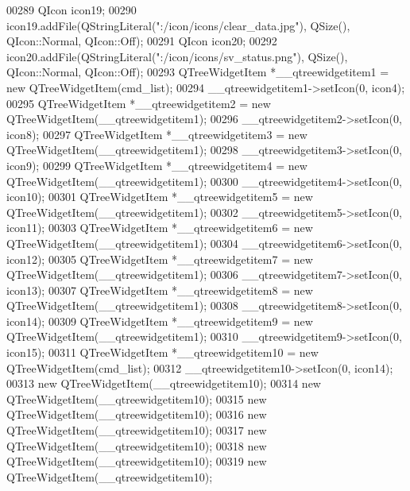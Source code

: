\begin{DoxyCode}
00289         QIcon icon19;
00290         icon19.addFile(QStringLiteral(\textcolor{stringliteral}{":/icon/icons/clear\_data.jpg"}), QSize(), QIcon::Normal, QIcon::Off);
00291         QIcon icon20;
00292         icon20.addFile(QStringLiteral(\textcolor{stringliteral}{":/icon/icons/sv\_status.png"}), QSize(), QIcon::Normal, QIcon::Off);
00293         QTreeWidgetItem *\_\_qtreewidgetitem1 = \textcolor{keyword}{new} QTreeWidgetItem(cmd\_list);
00294         \_\_qtreewidgetitem1->setIcon(0, icon4);
00295         QTreeWidgetItem *\_\_qtreewidgetitem2 = \textcolor{keyword}{new} QTreeWidgetItem(\_\_qtreewidgetitem1);
00296         \_\_qtreewidgetitem2->setIcon(0, icon8);
00297         QTreeWidgetItem *\_\_qtreewidgetitem3 = \textcolor{keyword}{new} QTreeWidgetItem(\_\_qtreewidgetitem1);
00298         \_\_qtreewidgetitem3->setIcon(0, icon9);
00299         QTreeWidgetItem *\_\_qtreewidgetitem4 = \textcolor{keyword}{new} QTreeWidgetItem(\_\_qtreewidgetitem1);
00300         \_\_qtreewidgetitem4->setIcon(0, icon10);
00301         QTreeWidgetItem *\_\_qtreewidgetitem5 = \textcolor{keyword}{new} QTreeWidgetItem(\_\_qtreewidgetitem1);
00302         \_\_qtreewidgetitem5->setIcon(0, icon11);
00303         QTreeWidgetItem *\_\_qtreewidgetitem6 = \textcolor{keyword}{new} QTreeWidgetItem(\_\_qtreewidgetitem1);
00304         \_\_qtreewidgetitem6->setIcon(0, icon12);
00305         QTreeWidgetItem *\_\_qtreewidgetitem7 = \textcolor{keyword}{new} QTreeWidgetItem(\_\_qtreewidgetitem1);
00306         \_\_qtreewidgetitem7->setIcon(0, icon13);
00307         QTreeWidgetItem *\_\_qtreewidgetitem8 = \textcolor{keyword}{new} QTreeWidgetItem(\_\_qtreewidgetitem1);
00308         \_\_qtreewidgetitem8->setIcon(0, icon14);
00309         QTreeWidgetItem *\_\_qtreewidgetitem9 = \textcolor{keyword}{new} QTreeWidgetItem(\_\_qtreewidgetitem1);
00310         \_\_qtreewidgetitem9->setIcon(0, icon15);
00311         QTreeWidgetItem *\_\_qtreewidgetitem10 = \textcolor{keyword}{new} QTreeWidgetItem(cmd\_list);
00312         \_\_qtreewidgetitem10->setIcon(0, icon14);
00313         \textcolor{keyword}{new} QTreeWidgetItem(\_\_qtreewidgetitem10);
00314         \textcolor{keyword}{new} QTreeWidgetItem(\_\_qtreewidgetitem10);
00315         \textcolor{keyword}{new} QTreeWidgetItem(\_\_qtreewidgetitem10);
00316         \textcolor{keyword}{new} QTreeWidgetItem(\_\_qtreewidgetitem10);
00317         \textcolor{keyword}{new} QTreeWidgetItem(\_\_qtreewidgetitem10);
00318         \textcolor{keyword}{new} QTreeWidgetItem(\_\_qtreewidgetitem10);
00319         \textcolor{keyword}{new} QTreeWidgetItem(\_\_qtreewidgetitem10);

\end{DoxyCode}
